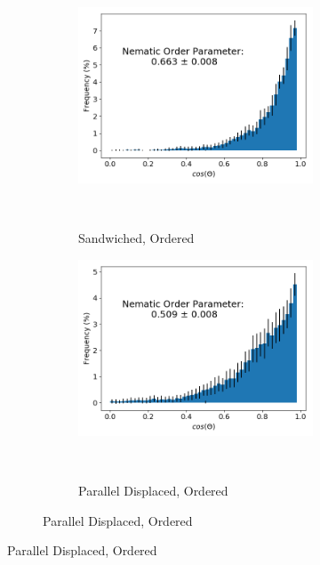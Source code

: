 \documentclass[journal=jpcbfk,manusciprt=article]{achemso}
\begin{document}
  \begin{figure}[!htb]

  \begin{subfigure}{\linewidth}
        \centering
        \begin{subfigure}{0.45\linewidth}
                \centering
                \includegraphics[width=\linewidth]{layered_nematic_order.png}
                \caption{Sandwiched, Ordered}~\label{fig:sandwich_nematic}
        \end{subfigure}%
        \begin{subfigure}{0.45\linewidth}
                \centering
                \includegraphics[width=\linewidth]{offset_nematic_order.png}
                \caption{Parallel Displaced, Ordered}~\label{fig:offset_nematic}

\end{subfigure}
\end{subfigure}
\end{figure}
\end{document}
